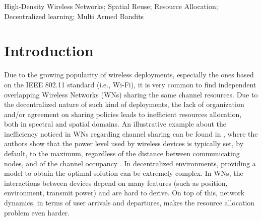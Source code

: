 \documentclass[preprint,12pt]{elsarticle}
\begin{document}
\begin{frontmatter}
\begin{keyword}
High-Density Wireless Networks; Spatial Reuse; Resource Allocation; Decentralized learning; Multi Armed Bandits 
\end{keyword}

\end{frontmatter}


\newpage

\section{Introduction}
\label{section:introduction}
Due to the growing popularity of wireless deployments, especially the ones based on the IEEE 802.11 standard (i.e., Wi-Fi), it is very common to find independent overlapping Wireless Networks (WNs) sharing the same channel resources. Due to the decentralized nature of such kind of deployments, the lack of organization and/or agreement on sharing policies leads to inefficient resources allocation, both in spectral and spatial domains. An illustrative example about the inefficiency noticed in WNs regarding channel sharing can be found in \cite{akella2007self}, where the authors show that the power level used by wireless devices is typically set, by default, to the maximum, regardless of the distance between communicating nodes, and of the channel occupancy \cite{akella2007self}. In decentralized environments, providing a model to obtain the optimal solution can be extremely complex. In WNs, the interactions between devices depend on many features (such as position, environment, transmit power) and are hard to derive. On top of this, network dynamics, in terms of user arrivals and departures, makes the resource allocation problem even harder. 
\end{document}
